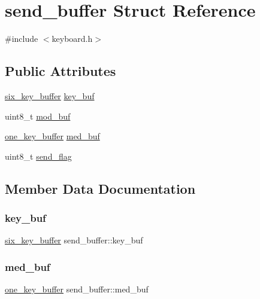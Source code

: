\hypertarget{structsend__buffer}{}\section{send\+\_\+buffer Struct Reference}
\label{structsend__buffer}


{\ttfamily \#include $<$keyboard.\+h$>$}

\subsection*{Public Attributes}
\begin{DoxyCompactItemize}
\item 
\hyperlink{structsix__key__buffer}{six\+\_\+key\+\_\+buffer} \hyperlink{structsend__buffer_ad39820475ee9397a3ea9152c167364f0}{key\+\_\+buf}
\item 
uint8\+\_\+t \hyperlink{structsend__buffer_a1ed1ea0b6d0ffbe2af4f8aff77cd5d56}{mod\+\_\+buf}
\item 
\hyperlink{structone__key__buffer}{one\+\_\+key\+\_\+buffer} \hyperlink{structsend__buffer_a2b3d51316974a1c39169664fa13b502b}{med\+\_\+buf}
\item 
uint8\+\_\+t \hyperlink{structsend__buffer_a2584076f9d2f17205d4625411b0d5808}{send\+\_\+flag}
\end{DoxyCompactItemize}


\subsection{Member Data Documentation}
\mbox{\label{structsend__buffer_ad39820475ee9397a3ea9152c167364f0}} 
\subsubsection{\texorpdfstring{key\+\_\+buf}{key\_buf}}
{\footnotesize\ttfamily \hyperlink{structsix__key__buffer}{six\+\_\+key\+\_\+buffer} send\+\_\+buffer\+::key\+\_\+buf}

\mbox{\label{structsend__buffer_a2b3d51316974a1c39169664fa13b502b}} 
\subsubsection{\texorpdfstring{med\+\_\+buf}{med\_buf}}
{\footnotesize\ttfamily \hyperlink{structone__key__buffer}{one\+\_\+key\+\_\+buffer} send\+\_\+buffer\+::med\+\_\+buf}

